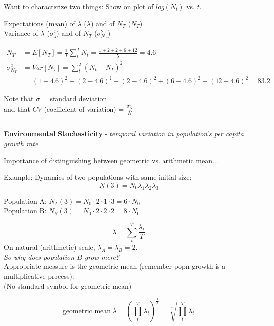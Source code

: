 \documentclass{article}
\newcommand{\note}[1]{\colorbox{gray!20}{#1}}
\newcommand{\ind}{\-\hspace{1cm}}
\begin{document}
Want to characterize two things: \note{Show on plot of $log(N_t)$ vs. $t$.}
\begin{center}
Expectations (mean) of $\lambda$ ($\bar{\lambda}$) and of $N_T$ ($\bar{N}_T$)\\
Variance of $\lambda$ ($\sigma_\lambda^2$) and of $N_T$ ($\sigma_{N_T}^2$)\
\end{center}
\begin{align*}
	\bar{N}_T &= E[N_T] = \frac{1}{T}\sum_t^T N_t = \frac{1+2+2+6+12}{5} = 4.6\\
	\sigma_{N_T}^2 & = Var[N_T] =  \sum_t^T (N_t - \bar{N}_T)^2\\
	& = (1-4.6)^2 + (2-4.6)^2 + (2-4.6)^2 + (6-4.6)^2 + (12-4.6)^2 = 83.2
\end{align*}

Note that $\sigma$ = standard deviation\\
\ind and that $CV$ (coefficient of variation) = $\frac{\sigma_N^2}{\bar{N}}$

\rule[0.5ex]{\linewidth}{1pt}

\textbf{Environmental Stochasticity} - \emph{temporal variation in population's per capita growth rate}

Importance of distinguishing between geometric vs. arithmetic mean...

Example: Dynamics of two populations with same initial size:
\begin{equation*}
	N(3) = N_0 \lambda_1 \lambda_2 \lambda_3
\end{equation*}
\begin{center}
	Population A: $N_A(3) = N_0 \cdot 2 \cdot 1 \cdot 3 = 6 \cdot N_0$\\
	Population B: $N_B(3) = N_0 \cdot 2 \cdot 2 \cdot 2 = 8 \cdot N_0$\\
\end{center}

\begin{equation*}
	\bar{\lambda} = \sum_t^T \frac{\lambda_t}{T}
\end{equation*}
On natural (arithmetic) scale, $\bar{\lambda}_A = \bar{\lambda}_B = 2$.\\

\emph{So why does population $B$ grow more?}\\
Appropriate measure is the geometric mean (remember popn growth is a multiplicative process):\\
(No standard symbol for geometric mean)

\begin{equation*}
	\text{geometric mean }\lambda = \left(\prod_t^T \lambda_t\right)^{\frac{1}{T}} = \sqrt[T]{\prod_t^T \lambda_t}
\end{equation*}
\end{document}
